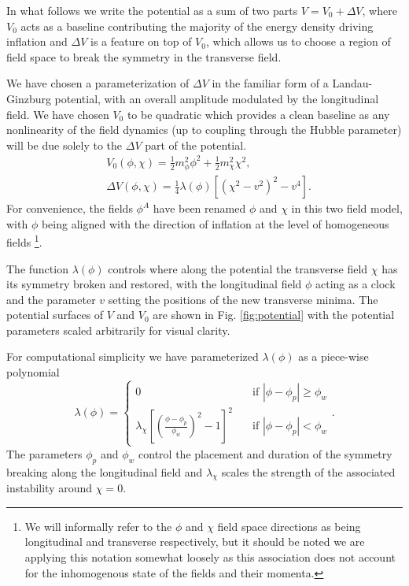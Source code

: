 In what follows we write the potential as a sum of two parts $V = V_0 + \Delta V$, where $V_0$ acts as a baseline contributing the majority of the energy density driving inflation and $\Delta V$ is a feature on top of $V_0$, which allows us to choose a region of field space to break the symmetry in the transverse field.

We have chosen a parameterization of $\Delta V$ in the familiar form of a Landau-Ginzburg potential, with an overall amplitude modulated by the longitudinal field. We have chosen $V_0$ to be quadratic which provides a clean baseline as any nonlinearity of the field dynamics (up to coupling through the Hubble parameter) will be due solely to the $\Delta V$ part of the potential.
\begin{align}
  &V_0(\phi,\chi) = \frac{1}{2}m^2_\phi\phi^2 + \frac{1}{2}m^2_\chi\chi^2, \label{eq:V0} \\
  &\Delta V(\phi,\chi) = \frac{1}{4}\lambda(\phi)\left[ (\chi^2-v^2)^2 - v^4 \right]. \label{eq:DeltaV}
\end{align}
For convenience, the fields $\phi^A$ have been renamed $\phi$ and $\chi$ in this two field model, with $\phi$ being aligned with the direction of inflation at the level of homogeneous fields \footnote{We will informally refer to the $\phi$ and $\chi$ field space directions as being longitudinal and transverse respectively, but it should be noted we are applying this notation somewhat loosely as this association does not account for the inhomogenous state of the fields and their momenta.}.

The function $\lambda(\phi)$ controls where along the potential the transverse field $\chi$ has its symmetry broken and restored, with the longitudinal field $\phi$ acting as a clock and the parameter $v$ setting the positions of the new transverse minima. The potential surfaces of $V$ and $V_0$ are shown in Fig. \ref{fig:potential} with the potential parameters scaled arbitrarily for visual clarity.

For computational simplicity we have parameterized $\lambda(\phi)$ as a piece-wise polynomial
\begin{equation} \label{eq:lambda}
  \lambda(\phi) =
  \begin{cases}
    0 & \quad \text{if } |\phi-\phi_p|\ge\phi_w \\
    \lambda_\chi\left[\left(\frac{\phi-\phi_p}{\phi_w}\right)^2 - 1 \right]^2 & \quad \text{if  } |\phi-\phi_p|<\phi_w
  \end{cases}.
\end{equation}
The parameters $\phi_p$ and $\phi_w$ control the placement and duration of the symmetry breaking along the longitudinal field and $\lambda_\chi$ scales the strength of the associated instability around $\chi=0$.

